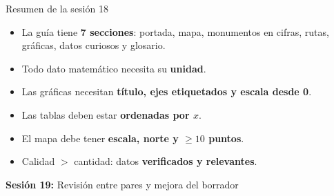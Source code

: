\documentclass[aspectratio=169, 10pt, spanish]{beamer}
\begin{document}
\begin{frame}{Resumen de la sesión 18}
  \begin{resumenbox}
    \begin{itemize}
      \item La guía tiene \textbf{7 secciones}: portada, mapa,
            monumentos en cifras, rutas, gráficas, datos curiosos
            y glosario.
      \item Todo dato matemático necesita su \textbf{unidad}.
      \item Las gráficas necesitan \textbf{título, ejes etiquetados
            y escala desde 0}.
      \item Las tablas deben estar \textbf{ordenadas por $x$}.
      \item El mapa debe tener \textbf{escala, norte y $\geq 10$ puntos}.
      \item Calidad $>$ cantidad: datos \textbf{verificados y relevantes}.
    \end{itemize}
  \end{resumenbox}
  \vspace{6pt}
  \begin{center}
    {\AlmFontSmall\color{AlmAzulM}\faArrowCircleRight\enskip
    \textbf{Sesión 19:} Revisión entre pares y mejora del borrador}
  \end{center}
\end{frame}
\end{document}
